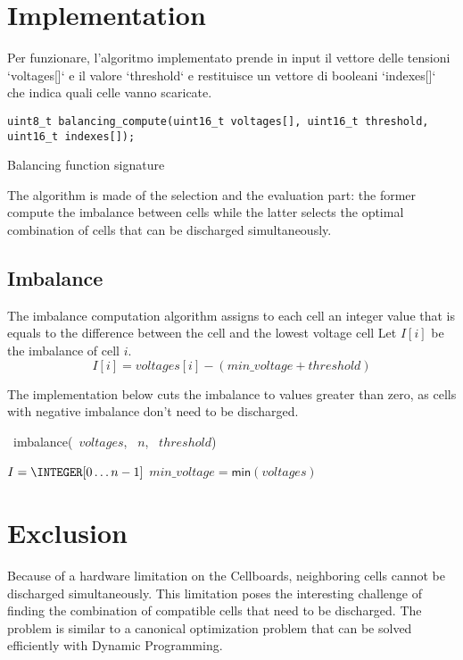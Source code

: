 \section{Implementation}
Per funzionare, l'algoritmo implementato prende in input il vettore delle tensioni `voltages[]` e il valore `threshold` e restituisce un vettore di booleani `indexes[]` che indica quali celle vanno scaricate.
\begin{listing}[h]
    \begin{verbatim}
uint8_t balancing_compute(uint16_t voltages[], uint16_t threshold, uint16_t indexes[]);
\end{verbatim}
    \caption{Balancing function signature}
    \label{listing:bal_signature}
\end{listing}

The algorithm is made of the selection and the evaluation part: the former compute the imbalance between cells while the latter selects the optimal combination of cells that can be discharged simultaneously.

\subsection{Imbalance}

The imbalance computation algorithm assigns to each cell an integer value that is equals to the difference between the cell and the lowest voltage cell
Let $I[i]$ be the imbalance of cell $i$.
\[
    I[i] = voltages[i] - (min\_voltage + threshold)
\]

The implementation below cuts the imbalance to values greater than zero, as cells with negative imbalance don't need to be discharged.

\begin{algorithm}[H]
    \DontPrintSemicolon
    \NoCaptionOfAlgo
    \caption[imbalance]{\INTARRAY\ \textsf{imbalance}(\INTARRAY\ $voltages$, \INTEGER\ $n$, \INTEGER\ $threshold$)}\label{algorithm:imbalance}


    $I = \INTEGER[0 \ldots n-1]$\;
    $min\_voltage=\textsf{min}(voltages)$\;
\end{algorithm}

\section{Exclusion}
Because of a hardware limitation on the Cellboards, neighboring cells cannot be discharged simultaneously. This limitation poses the interesting challenge of finding the combination of compatible cells that need to be discharged. The problem is similar to a canonical optimization problem that can be solved efficiently with Dynamic Programming.

